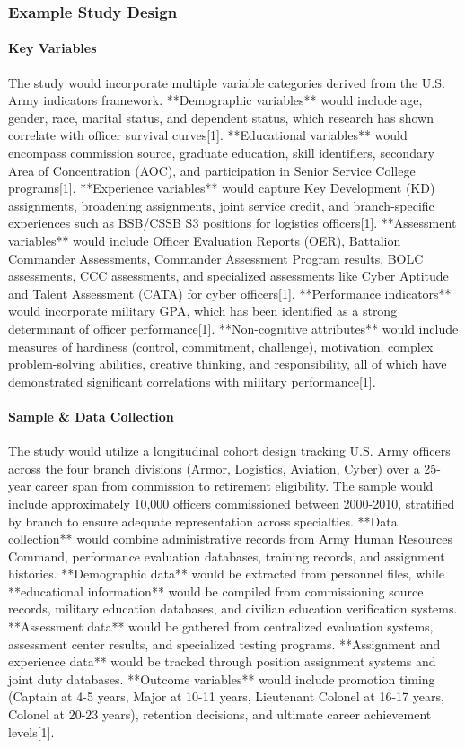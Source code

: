 \documentclass[main.tex]{subfiles}
\begin{document}
\subsubsection{Example Study Design}

\paragraph{Key Variables}

The study would incorporate multiple variable categories derived from the U.S. Army indicators framework. **Demographic variables** would include age, gender, race, marital status, and dependent status, which research has shown correlate with officer survival curves[1]. **Educational variables** would encompass commission source, graduate education, skill identifiers, secondary Area of Concentration (AOC), and participation in Senior Service College programs[1]. **Experience variables** would capture Key Development (KD) assignments, broadening assignments, joint service credit, and branch-specific experiences such as BSB/CSSB S3 positions for logistics officers[1]. **Assessment variables** would include Officer Evaluation Reports (OER), Battalion Commander Assessments, Commander Assessment Program results, BOLC assessments, CCC assessments, and specialized assessments like Cyber Aptitude and Talent Assessment (CATA) for cyber officers[1]. **Performance indicators** would incorporate military GPA, which has been identified as a strong determinant of officer performance[1]. **Non-cognitive attributes** would include measures of hardiness (control, commitment, challenge), motivation, complex problem-solving abilities, creative thinking, and responsibility, all of which have demonstrated significant correlations with military performance[1].

\paragraph{Sample \& Data Collection}

The study would utilize a longitudinal cohort design tracking U.S. Army officers across the four branch divisions (Armor, Logistics, Aviation, Cyber) over a 25-year career span from commission to retirement eligibility. The sample would include approximately 10,000 officers commissioned between 2000-2010, stratified by branch to ensure adequate representation across specialties. **Data collection** would combine administrative records from Army Human Resources Command, performance evaluation databases, training records, and assignment histories. **Demographic data** would be extracted from personnel files, while **educational information** would be compiled from commissioning source records, military education databases, and civilian education verification systems. **Assessment data** would be gathered from centralized evaluation systems, assessment center results, and specialized testing programs. **Assignment and experience data** would be tracked through position assignment systems and joint duty databases. **Outcome variables** would include promotion timing (Captain at 4-5 years, Major at 10-11 years, Lieutenant Colonel at 16-17 years, Colonel at 20-23 years), retention decisions, and ultimate career achievement levels[1].
\end{document}
